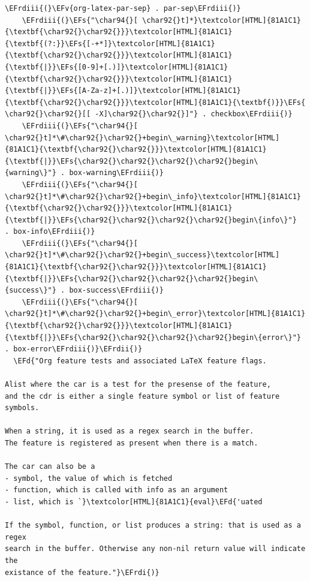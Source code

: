 \documentclass{scrartcl}
\newcommand{\EFd}[1]{\textcolor{EFd}{#1}} %
\newcommand{\EFs}[1]{\textcolor{EFs}{#1}} %
\newcommand{\EFv}[1]{\textcolor{EFv}{#1}} %
\newcommand{\EFrdi}[1]{#1} %
\newcommand{\EFrdii}[1]{#1} %
\newcommand{\EFrdiii}[1]{#1} %
\begin{document}
\begin{Code}
\begin{Verbatim}[]
    \EFrdiii{(}\EFv{org-latex-par-sep} . par-sep\EFrdiii{)}
    \EFrdiii{(}\EFs{"\char94{}[ \char92{}t]*}\textcolor[HTML]{81A1C1}{\textbf{\char92{}\char92{}}}\textcolor[HTML]{81A1C1}{\textbf{(?:}}\EFs{[-+*]}\textcolor[HTML]{81A1C1}{\textbf{\char92{}\char92{}}}\textcolor[HTML]{81A1C1}{\textbf{|}}\EFs{[0-9]+[.)]}\textcolor[HTML]{81A1C1}{\textbf{\char92{}\char92{}}}\textcolor[HTML]{81A1C1}{\textbf{|}}\EFs{[A-Za-z]+[.)]}\textcolor[HTML]{81A1C1}{\textbf{\char92{}\char92{}}}\textcolor[HTML]{81A1C1}{\textbf{)}}\EFs{ \char92{}\char92{}[[ -X]\char92{}\char92{}]"} . checkbox\EFrdiii{)}
    \EFrdiii{(}\EFs{"\char94{}[ \char92{}t]*\#\char92{}\char92{}+begin\_warning}\textcolor[HTML]{81A1C1}{\textbf{\char92{}\char92{}}}\textcolor[HTML]{81A1C1}{\textbf{|}}\EFs{\char92{}\char92{}\char92{}\char92{}begin\{warning\}"} . box-warning\EFrdiii{)}
    \EFrdiii{(}\EFs{"\char94{}[ \char92{}t]*\#\char92{}\char92{}+begin\_info}\textcolor[HTML]{81A1C1}{\textbf{\char92{}\char92{}}}\textcolor[HTML]{81A1C1}{\textbf{|}}\EFs{\char92{}\char92{}\char92{}\char92{}begin\{info\}"}       . box-info\EFrdiii{)}
    \EFrdiii{(}\EFs{"\char94{}[ \char92{}t]*\#\char92{}\char92{}+begin\_success}\textcolor[HTML]{81A1C1}{\textbf{\char92{}\char92{}}}\textcolor[HTML]{81A1C1}{\textbf{|}}\EFs{\char92{}\char92{}\char92{}\char92{}begin\{success\}"} . box-success\EFrdiii{)}
    \EFrdiii{(}\EFs{"\char94{}[ \char92{}t]*\#\char92{}\char92{}+begin\_error}\textcolor[HTML]{81A1C1}{\textbf{\char92{}\char92{}}}\textcolor[HTML]{81A1C1}{\textbf{|}}\EFs{\char92{}\char92{}\char92{}\char92{}begin\{error\}"}     . box-error\EFrdiii{)}\EFrdii{)}
  \EFd{"Org feature tests and associated LaTeX feature flags.

Alist where the car is a test for the presense of the feature,
and the cdr is either a single feature symbol or list of feature symbols.

When a string, it is used as a regex search in the buffer.
The feature is registered as present when there is a match.

The car can also be a
- symbol, the value of which is fetched
- function, which is called with info as an argument
- list, which is `}\textcolor[HTML]{81A1C1}{eval}\EFd{'uated

If the symbol, function, or list produces a string: that is used as a regex
search in the buffer. Otherwise any non-nil return value will indicate the
existance of the feature."}\EFrdi{)}
\end{Verbatim}
\end{Code}
\end{document}
